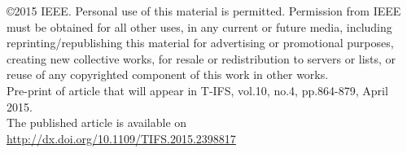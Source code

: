 \documentclass[journal,onecolumn,12pt]{IEEEtran}
\begin{document}
\noindent \copyright 2015 IEEE. Personal use of this material is permitted. Permission from IEEE must be obtained for all other uses, in any current or future media, including reprinting/republishing this material for advertising or promotional purposes, creating new collective works, for resale or redistribution to servers or lists, or reuse of any copyrighted component of this work in other works.
\\

\noindent Pre-print of article that will appear in T-IFS, vol.10, no.4, pp.864-879, April 2015.
\\

\noindent The published article is available on \url{http://dx.doi.org/10.1109/TIFS.2015.2398817}


\end{document}
